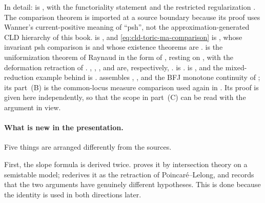 In detail:  is
\cite[Theorem~4.7 and Corollary~4.8]{Wanner19}, with the functoriality
statement \cite[Corollary~5.1]{Wanner19} and the restricted regularization
\cite[Corollary~5.4]{Wanner19}.  The comparison theorem is imported at a
source boundary because its proof uses Wanner's current-positive meaning of
``psh'', not the approximation-generated CLD hierarchy of this book.
 is
\cite[Proposition~8.13 and Corollary~8.14]{GK19}, and
\eqref{eq:cld-toric-ma-comparison} is \cite[Theorem~6.1.1]{BGJKK25}, whose
invariant psh comparison is \cite[Theorem~5.3.11]{BGJKK25} and whose
existence theorems are \cite[Theorems~6.3.13 and~8.3.3]{BGJKK25}.
 is the uniformization theorem of Raynaud in the
form of \cite[Appendix~B.5]{CLD25}, resting on
\cite{BoschLutkebohmert1993}, with the deformation retraction of
\cite[Chapter~6]{Berk12}.  ,
,
,
 and
 are, respectively,
\cite[Lemmas~19.1.4 and~19.1.6, Proposition~19.1.8; Proposition~19.2.5;
Proposition~19.3.1 with Corollary~19.3.2 and Theorem~B.6.4;
Corollary~19.2.8; Corollary~19.2.9 with Remark~19.3.4]{CLD25}.
 is \cite[Remarks~19.2.3 and
Proposition~17.4.13]{CLD25}.   is
\cite[Proposition~16.2]{GJR26}, and the mixed-reduction example behind
 is \cite[Remark~16.4 and \S17]{GJR26}.
 assembles
,
,  and the BFJ
monotone continuity of \cite[\S\S2.7 and~3]{BFJ15}; its part~(B) is the common-locus measure comparison used again in
.  Its proof is given here independently,
so that the scope in part~(C) can be read with the argument in view.

\paragraph{What is new in the presentation.}
Five things are arranged differently from the sources.

First, the slope formula is derived twice.  
proves it by intersection theory on a semistable model;
 rederives it as the retraction of
Poincar\'e--Lelong, and  records that the
two arguments have genuinely different hypotheses.  This is done because
the identity is used in both directions later.

